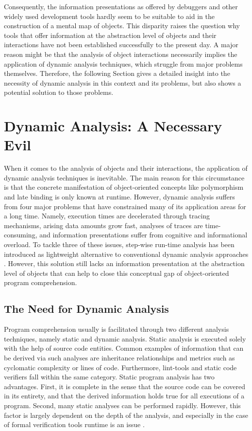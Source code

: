 Consequently, the information presentations as offered by debuggers and other widely used development tools hardly seem to be suitable to aid in the construction of a mental map of objects.
This disparity raises the question why tools that offer information at the abstraction level of objects and their interactions have not been established successfully to the present day.
A major reason might be that the analysis of object interactions necessarily implies the application of dynamic analysis techniques, which struggle from major problems themselves.
Therefore, the following Section gives a detailed insight into the necessity of dynamic analysis in this context and its problems, but also shows a potential solution to those problems.

\section[Dynamic Analysis: A Necessary Evil]{Dynamic Analysis: A Necessary Evil%
}
\label{s:BackgroundAnalysis}
When it comes to the analysis of objects and their interactions, the application of dynamic analysis techniques is inevitable.
The main reason for this circumstance is that the concrete manifestation of object-oriented concepts like polymorphism and late binding is only known at runtime.
However, dynamic analysis suffers from four major problems that have constrained many of its application areas for a long time.
Namely, execution times are decelerated through tracing mechanisms, arising data amounts grow fast, analyses of traces are time-consuming, and information presentations suffer from cognitive and informational overload.
To tackle three of these issues, step-wise run-time analysis has been introduced as lightweight alternative to conventional dynamic analysis approaches \cite{perscheid_immediacy_2010}.
However, this solution still lacks an information presentation at the abstraction level of objects that can help to close this conceptual gap of object-oriented program comprehension.

\subsection{The Need for Dynamic Analysis}
\label{ss:BackgroundAnalysisNeccessity}
Program comprehension usually is facilitated through two different analysis techniques, namely static and dynamic analysis.
Static analysis is executed solely with the help of source code entities.
Common examples of information that can be derived via such analyses are inheritance relationships and metrics such as cyclomatic complexity or lines of code.
Furthermore, lint-tools and static code verifiers fall within the same category.
Static program analysis has two advantages.
First, it is complete in the sense that the source code can be covered in its entirety, and that the derived information holds true for all executions of a program.
Second, many static analyses can be performed rapidly.
However, this factor is largely dependent on the depth of the analysis, and especially in the case of formal verification tools runtime is an issue \cite{wichmann_industrial_1995}.

